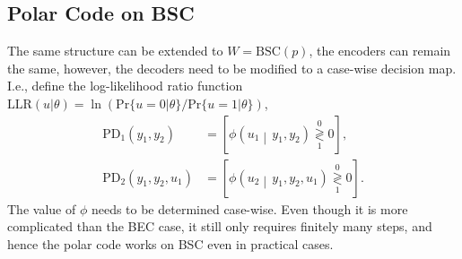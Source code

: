 \subsection{Polar Code on BSC}
The same structure can be extended to $W=\mathrm{BSC}(p)$, the encoders can remain the same, however, the decoders need to be modified to a case-wise decision map. I.e., define the log-likelihood ratio function $\mathrm{LLR}(u\vert\theta) = \ln \left(\mathrm{Pr}\{u=0\vert\theta\} / \mathrm{Pr}\{u=1\vert\theta\}\right)$,
\begin{equation}\begin{aligned}
    \mathrm{PD}_1(y_1,y_2) &= \left[\phi\left(u_1\middle\vert\, y_1,y_2\right) \underset{1}{\overset{0}{\gtrless}} 0\right],\\
    \mathrm{PD}_2(y_1,y_2,u_1) &= \left[\phi\left(u_2\middle\vert\, y_1,y_2,u_1\right) \underset{1}{\overset{0}{\gtrless}} 0\right].
\end{aligned}\end{equation}
The value of $\phi$ needs to be determined case-wise. Even though it is more complicated than the BEC case, it still only requires finitely many steps, and hence the polar code works on BSC even in practical cases.

